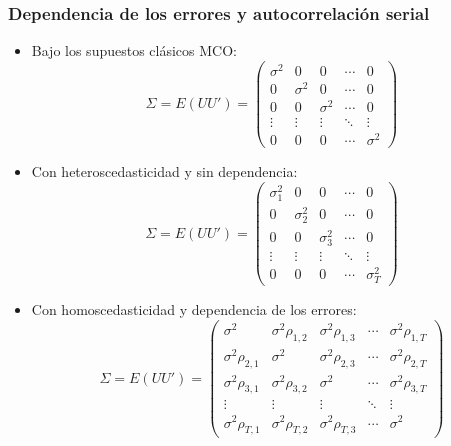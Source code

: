 \documentclass{beamer}
\begin{document}
\begin{frame}[shrink=20]
\frametitle{Dependencia de los errores y autocorrelación serial}

\begin{itemize}
  \item Bajo los supuestos clásicos MCO:
  \[
  \Sigma = E(UU') = 
  \begin{pmatrix}
  \sigma^2 & 0 & 0 & \cdots & 0 \\
  0 & \sigma^2 & 0 & \cdots & 0 \\
  0 & 0 & \sigma^2 & \cdots & 0 \\
  \vdots & \vdots & \vdots & \ddots & \vdots \\
  0 & 0 & 0 & \cdots & \sigma^2
  \end{pmatrix}
  \]

  \item Con heteroscedasticidad y sin dependencia:
  \[
  \Sigma = E(UU') = 
  \begin{pmatrix}
  \sigma^2_1 & 0 & 0 & \cdots & 0 \\
  0 & \sigma^2_2 & 0 & \cdots & 0 \\
  0 & 0 & \sigma^2_3 & \cdots & 0 \\
  \vdots & \vdots & \vdots & \ddots & \vdots \\
  0 & 0 & 0 & \cdots & \sigma^2_T
  \end{pmatrix}
  \]

  \item Con homoscedasticidad y dependencia de los errores:
  \[
  \Sigma = E(UU') = 
  \begin{pmatrix}
  \sigma^2 & \sigma^2 \rho_{1,2} & \sigma^2 \rho_{1,3} & \cdots & \sigma^2 \rho_{1,T} \\
  \sigma^2 \rho_{2,1} & \sigma^2 & \sigma^2 \rho_{2,3} & \cdots & \sigma^2 \rho_{2,T} \\
  \sigma^2 \rho_{3,1} & \sigma^2 \rho_{3,2} & \sigma^2 & \cdots & \sigma^2 \rho_{3,T} \\
  \vdots & \vdots & \vdots & \ddots & \vdots \\
  \sigma^2 \rho_{T,1} & \sigma^2 \rho_{T,2} & \sigma^2 \rho_{T,3} & \cdots & \sigma^2
  \end{pmatrix}
  \]
\end{itemize}

\end{frame}
\end{document}
